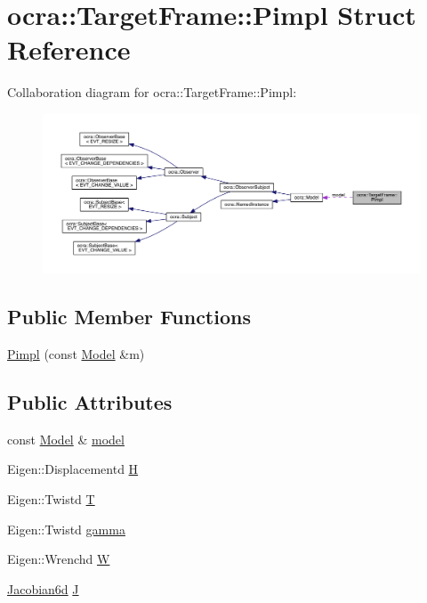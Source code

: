 \hypertarget{structocra_1_1TargetFrame_1_1Pimpl}{}\section{ocra\+:\+:Target\+Frame\+:\+:Pimpl Struct Reference}
\label{structocra_1_1TargetFrame_1_1Pimpl}


Collaboration diagram for ocra\+:\+:Target\+Frame\+:\+:Pimpl\+:\nopagebreak
\begin{figure}[H]
\begin{center}
\leavevmode
\includegraphics[width=350pt]{da/d25/structocra_1_1TargetFrame_1_1Pimpl__coll__graph}
\end{center}
\end{figure}
\subsection*{Public Member Functions}
\begin{DoxyCompactItemize}
\item 
\hyperlink{structocra_1_1TargetFrame_1_1Pimpl_a01712cd9b98c68bfce55c2edab2cc846}{Pimpl} (const \hyperlink{classocra_1_1Model}{Model} \&m)
\end{DoxyCompactItemize}
\subsection*{Public Attributes}
\begin{DoxyCompactItemize}
\item 
const \hyperlink{classocra_1_1Model}{Model} \& \hyperlink{structocra_1_1TargetFrame_1_1Pimpl_a7edc0b09f919bb223a44001cdba8dc84}{model}
\item 
Eigen\+::\+Displacementd \hyperlink{structocra_1_1TargetFrame_1_1Pimpl_a84a376863b43fa29115be56fa326d8df}{H}
\item 
Eigen\+::\+Twistd \hyperlink{structocra_1_1TargetFrame_1_1Pimpl_aecb4d2e7692ee0ff9298e8802756e098}{T}
\item 
Eigen\+::\+Twistd \hyperlink{structocra_1_1TargetFrame_1_1Pimpl_a1c9e215a8979352974e88f7606a738b7}{gamma}
\item 
Eigen\+::\+Wrenchd \hyperlink{structocra_1_1TargetFrame_1_1Pimpl_a4ff4bfb5366d48f34539e73fa7b18351}{W}
\item 
\hyperlink{namespaceocra_ac73b015f9f7cb0c252c4d5c4800f559a}{Jacobian6d} \hyperlink{structocra_1_1TargetFrame_1_1Pimpl_afc2a059aca6dc89c5da22b1b86b36922}{J}
\end{DoxyCompactItemize}


